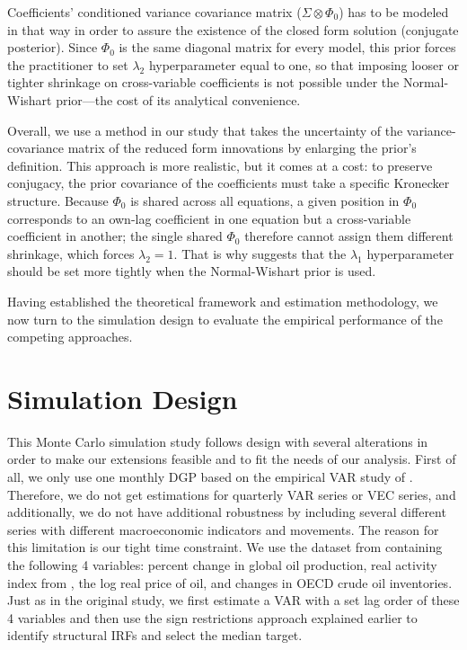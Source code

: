 \documentclass[12pt, a4paper]{article}
\begin{document}
Coefficients' conditioned variance covariance matrix ($\Sigma \otimes \Phi_0$) has to be modeled in that way in order to assure the existence of the closed form solution (conjugate posterior). Since $\Phi_0$ is the same diagonal matrix for every model, this prior forces the practitioner to set $\lambda_2$ hyperparameter equal to one, so that imposing looser or tighter shrinkage on cross-variable coefficients is not possible under the Normal-Wishart prior—the cost of its analytical convenience.\footnotemark[6]

Overall, we use a method in our study that takes the uncertainty of the variance-covariance matrix of the reduced form innovations by enlarging the prior’s definition. This approach is more realistic, but it comes at a cost: to preserve conjugacy, the prior covariance of the coefficients must take a specific Kronecker structure. Because $\Phi_0$ is shared across all equations, a given position in $\Phi_0$ corresponds to an own-lag coefficient in one equation but a cross-variable coefficient in another; the single shared $\Phi_0$ therefore cannot assign them different shrinkage, which forces $\lambda_2 = 1$. That is why \citet{dieppeBEARToolbox2016} suggests that the $\lambda_1$ hyperparameter should be set more tightly when the Normal-Wishart prior is used.

Having established the theoretical framework and estimation methodology, we now turn to the simulation design to evaluate the empirical performance of the competing approaches.

\section{Simulation Design}
\label{sec:simulation}

This Monte Carlo simulation study follows \citet{ivanovPractitionersGuideLag2005} design with several alterations in order to make our extensions feasible and to fit the needs of our analysis. First of all, we only use one monthly DGP based on the empirical VAR study of \citet{kilianRoleInventoriesSpeculative2014}. Therefore, we do not get estimations for quarterly VAR series or VEC series, and additionally, we do not have additional robustness by including several different series with different macroeconomic indicators and movements. The reason for this limitation is our tight time constraint. We use the dataset from \citet{kilianRoleInventoriesSpeculative2014} containing the following 4 variables: percent change in global oil production, real activity index from \citet{kilianNotAllOil2009}, the log real price of oil, and changes in OECD crude oil inventories. Just as in the original study, we first estimate a VAR with a set lag order of these 4 variables and then use the sign restrictions approach explained earlier to identify structural IRFs and select the median target.
\end{document}
